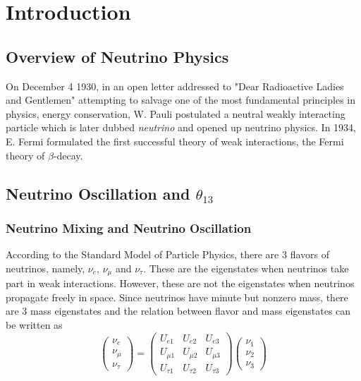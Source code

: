 \chapter{Introduction}

\section{Overview of Neutrino Physics}

On December 4 1930, in an open letter addressed to "Dear Radioactive Ladies and Gentlemen" attempting to salvage one of the most fundamental principles in physics, energy conservation, W. Pauli postulated a neutral weakly interacting particle which is later dubbed \emph{neutrino} and opened up neutrino physics. In 1934, E. Fermi formulated the first successful theory of weak interactions, the Fermi theory of $\beta$-decay.

\section{Neutrino Oscillation and \texorpdfstring{$\theta_{13}$}{theta13}}

\subsection{Neutrino Mixing and Neutrino Oscillation}
According to the Standard Model of Particle Physics, there are 3 flavors of neutrinos, namely, $\nu_e$, $\nu_\mu$ and $\nu_\tau$. These are the eigenstates when neutrinos take part in weak interactions. However, these are not the eigenstates when neutrinos propagate freely in space. Since neutrinos have minute but nonzero mass, there are 3 mass eigenstates and the relation between flavor and mass eigenstates can be written as
\begin{equation}
\left( \begin{array}{c} \nu_e \\ \nu_\mu \\ \nu_\tau \end{array} \right)
=
\begin{pmatrix}
U_{e1} & U_{e2} & U_{e3} \\
U_{\mu1} & U_{\mu2} & U_{\mu3} \\
U_{\tau1} & U_{\tau2} & U_{\tau3}
\end{pmatrix}
\left( \begin{array}{c} \nu_1 \\ \nu_2 \\ \nu_3 \end{array} \right)
\end{equation}

